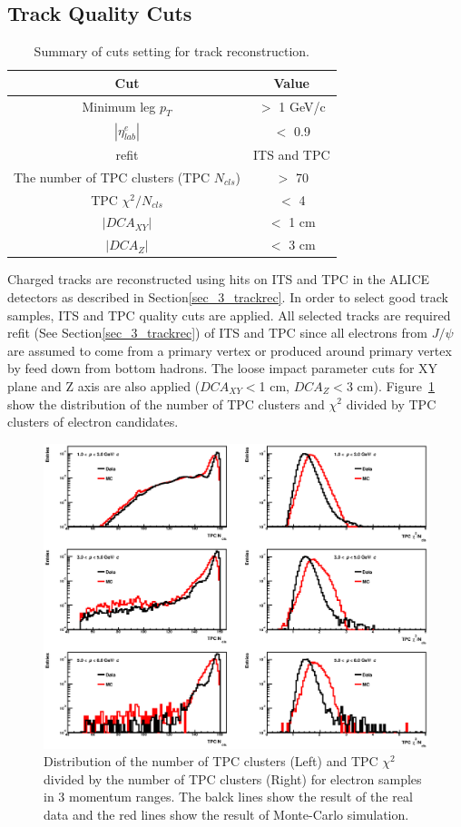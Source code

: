 \subsection{Track Quality Cuts}
\begin{table}[!htb]
  \centering
  \begin{tabular}{cc} \hline
    Cut   & Value \\ \hline
    Minimum leg $p_{T}$  & $>$ 1 GeV/c \\ \hline
    $|\eta^{e}_{lab}|$  & $<$ 0.9 \\ \hline
    refit  &  ITS and TPC\\ \hline
    The number of TPC clusters (TPC $N_{cls}$) & $>$ 70 \\ \hline
    TPC $\chi^{2}/N_{cls}$ & $<$ 4 \\ \hline
    $|DCA_{XY}|$ & $<$ 1 cm \\ \hline
    $|DCA_{Z}|$ & $<$ 3 cm \\ \hline
  \end{tabular}  
  \caption{Summary of cuts setting for track reconstruction. }
\end{table}
Charged tracks are reconstructed using hits on ITS and TPC in the ALICE detectors as described in Section\ref{sec_3_trackrec}.
In order to select good track samples, ITS and TPC quality cuts are applied. 
All selected tracks are required refit (See Section\ref{sec_3_trackrec}) of ITS and TPC since all electrons from $J/\psi$ are assumed to  come from a primary vertex or produced around primary vertex by feed down from bottom hadrons.
The loose impact parameter cuts for XY plane and Z axis are also applied ($DCA_{XY} <$1 cm, $DCA_{Z} < $3 cm).  
Figure~\ref{fig_4_qa_tpc} show the distribution of the number of TPC clusters and $\chi^{2}$ divided by TPC clusters of electron candidates. 
\begin{figure}[!h]
  \centering
  \includegraphics[width=15cm]{chap4/figure/TrackQA/QA_MomBin_tof3_tpc2_tpcpi3_MB.eps}
  \caption{Distribution of the number of TPC clusters (Left) and TPC $\chi^{2}$ divided by the number of TPC clusters (Right) for electron samples in 3 momentum ranges. The balck lines show the result of the real data and the red lines show the result of Monte-Carlo simulation.}
  \label{fig_4_qa_tpc}
\end{figure}
